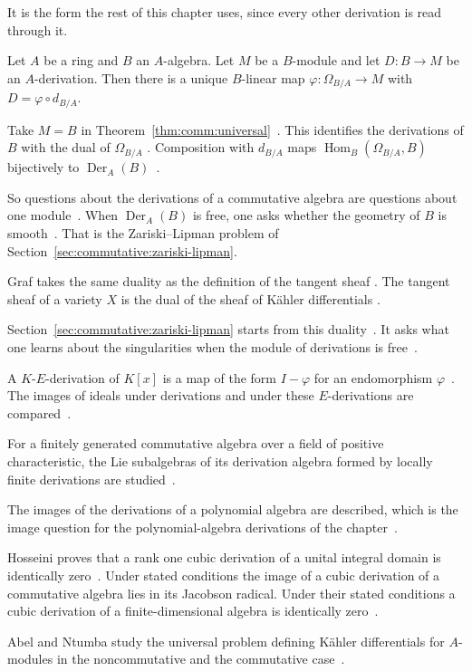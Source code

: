 It is the form the rest of this chapter uses, since every other derivation is
read through it.

\begin{theorem}\label{thm:comm:universal}
Let $A$ be a ring and $B$ an $A$-algebra. Let $M$ be a $B$-module and let
$D\colon B\to M$ be an $A$-derivation. Then there is a unique $B$-linear map
$\varphi\colon \Omega_{B/A} \to M$ with $D = \varphi\circ d_{B/A}$.
\end{theorem}

Take $M = B$ in Theorem~\ref{thm:comm:universal}~\cite[p.~92]{Johnson1969Kahler}. This identifies the
derivations of $B$ with the dual of $\Omega_{B/A}$
\cite[p.~92]{Johnson1969Kahler}. Composition with $d_{B/A}$ maps
$\operatorname{Hom}_B(\Omega_{B/A}, B)$ bijectively to
$\operatorname{Der}_A(B)$~\cite[p.~92]{Johnson1969Kahler}.

So questions about the derivations of a commutative algebra are questions
about one module~\cite[p.~92]{Johnson1969Kahler}. When
$\operatorname{Der}_A(B)$ is free, one asks whether the geometry of $B$ is
smooth~\cite[p.~270]{BiswasGurjarKolte2014}. That is the Zariski--Lipman
problem of Section~\ref{sec:commutative:zariski-lipman}.

Graf takes the same duality as the definition of the tangent sheaf
\cite[p.~115]{Graf2022LZPosChar}. The tangent sheaf of a variety $X$ is the
dual of the sheaf of Kähler differentials
\cite[p.~115]{Graf2022LZPosChar}.

Section~\ref{sec:commutative:zariski-lipman} starts from this duality~\cite[p.~270]{BiswasGurjarKolte2014}. It asks
what one learns about the singularities when the module of derivations is
free~\cite[p.~270]{BiswasGurjarKolte2014}.

A $K$-$E$-derivation of $K[x]$ is a map of the form $I-\varphi$ for an
endomorphism $\varphi$~\cite{WlImagesOfIdeals2008}. The images of ideals under derivations and under
these $E$-derivations are compared~\cite{WlImagesOfIdeals2008}.

For a finitely generated commutative algebra over a field of positive
characteristic, the Lie subalgebras of its derivation algebra formed by
locally finite derivations are
studied~\cite{WlLieAlgebrasOfLocallyFiniteDeri2019}.

The images of the derivations of a polynomial algebra are described, which is
the image question for the polynomial-algebra derivations of the
chapter~\cite{WlImagesOfDerivationsOfPolynomia2017}.

Hosseini proves that a rank one cubic derivation of a unital integral domain
is identically zero~\cite{WlWhatCanBeExpectedFromACubicDer2017}. Under stated conditions the image of a cubic
derivation of a commutative algebra lies in its Jacobson radical. Under their %
stated conditions a cubic derivation of a finite-dimensional algebra is
identically zero~\cite{WlWhatCanBeExpectedFromACubicDer2017}.

Abel and Ntumba study the universal problem defining K\"ahler differentials
for $A$-modules in the noncommutative and the commutative
case~\cite{WlUniversalProblemForKaehlerDiff2014}.
